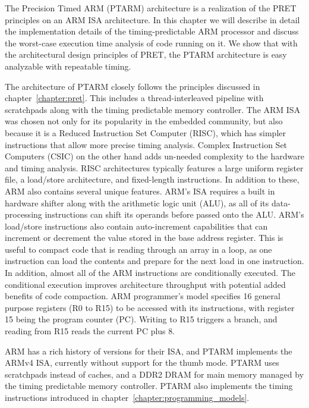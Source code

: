 The Precision Timed ARM (PTARM) architecture is a realization of the PRET principles on an ARM ISA architecture. 
In this chapter we will describe in detail the implementation details of the timing-predictable ARM processor and discuss the worst-case execution time analysis of code running on it.
We show that with the architectural design principles of PRET, the PTARM architecture is easy analyzable with repeatable timing.
  
The architecture of PTARM closely follows the principles discussed in chapter~\ref{chapter:pret}.
This includes a thread-interleaved pipeline with scratchpads along with the timing predictable memory controller.
The ARM ISA was chosen not only for its popularity in the embedded community, but also because it is a Reduced Instruction Set Computer (RISC), which has simpler instructions that allow more precise timing analysis. 
Complex Instruction Set Computers (CSIC) on the other hand adds un-needed complexity to the hardware and timing analysis.
RISC architectures typically features a large uniform register file, a load/store architecture, and fixed-length instructions.
In addition to these, ARM also contains several unique features.
ARM's ISA requires a built in hardware shifter along with the arithmetic logic unit (ALU), as all of its data-processing instructions can shift its operands before passed onto the ALU. 
ARM's load/store instructions also contain auto-increment capabilities that can increment or decrement the value stored in the base address register. 
This is useful to compact code that is reading through an array in a loop, as one instruction can load the contents and prepare for the next load in one instruction.
In addition, almost all of the ARM instructions are conditionally executed.
The conditional execution improves architecture throughput with potential added benefits of code compaction.     
ARM programmer's model specifies 16 general purpose registers (R0 to R15) to be accessed with its instructions, with register 15 being the program counter (PC). 
Writing to R15 triggers a branch, and reading from R15 reads the current PC plus 8.

ARM has a rich history of versions for their ISA, and PTARM implements the ARMv4 ISA, currently without support for the thumb mode.
PTARM uses scratchpads instead of caches, and a DDR2 DRAM for main memory managed by the timing predictable memory controller.
PTARM also implements the timing instructions introduced in chapter~\ref{chapter:programming_models}.   


